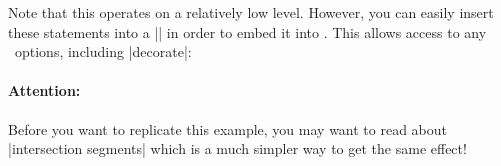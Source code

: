 \begin{command}{\pgfcomputeintersectionsegments{}}
\begin{codeexample}[vbox]
\end{codeexample}
	Note that this operates on a relatively low level. However, you can easily insert these statements into a |\pgfextra| in order to embed it into \tikzname. This allows access to any \tikzname\ options, including |decorate|:
\begin{codeexample}[vbox]
\end{codeexample}
	\paragraph{Attention:} Before you want to replicate this example, you may want to read about |intersection segments| which is a much simpler way to get the same effect!
\end{command}


